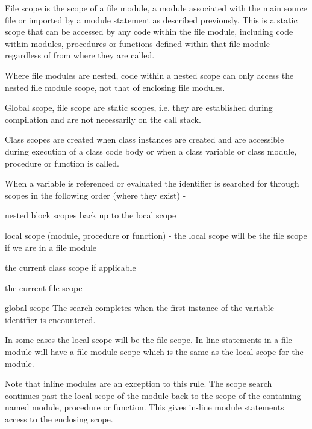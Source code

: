         File scope is the scope of a file module, a module associated with the
        main source file or imported by a module statement as described
        previously. This is a static scope that can be accessed by any code
        within the file module, including code within modules, procedures or
        functions defined within that file module regardless of from where they
        are called.
        
        Where file modules are nested, code within a nested scope can only
        access the nested file module scope, not that of enclosing file modules.
        
        Global scope, file scope are static scopes, i.e. they are
        established during compilation and are not necessarily on the call stack.
        
        Class scopes are created when class instances are created and are
        accessible during execution of a class code body or when a class
        variable or class module, procedure or function is called.

        When a variable is referenced or evaluated the identifier is searched
        for through scopes in the following order (where they exist) -
        \blist
        \item   nested block scopes back up to the local scope
        \item   local scope (module, procedure or function) - the local scope
                will be the file scope if we are in a file module
        \item   the current class scope if applicable
        \item   the current file scope
        \item   global scope
        \blend
        The search completes when the first instance of the variable
        identifier is encountered.
        
        In some cases the local scope will be the file scope. In-line statements
        in a file module will have a file module scope which is the same as
        the local scope for the module.

        Note that inline modules are an exception to this rule. The scope
        search continues past the local scope of the module back to the scope
        of the containing named module, procedure or function. This gives
        in-line module statements access to the enclosing scope.

